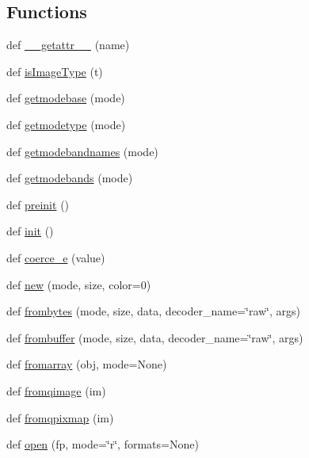 \subsection*{Functions}
\begin{DoxyCompactItemize}
\item 
def \hyperlink{namespacePIL_1_1Image_af8d4e74b562bf94355af0c4fa545c562}{\+\_\+\+\_\+getattr\+\_\+\+\_\+} (name)
\item 
def \hyperlink{namespacePIL_1_1Image_a98e2f107c84c08a9a518f23e8dbab804}{is\+Image\+Type} (t)
\item 
def \hyperlink{namespacePIL_1_1Image_a7d4b86f15fb169471254d5239a94bf64}{getmodebase} (mode)
\item 
def \hyperlink{namespacePIL_1_1Image_ae7953cd6e6a3ad042c5187330c0314fc}{getmodetype} (mode)
\item 
def \hyperlink{namespacePIL_1_1Image_aaed91fedabe8cc0158bb5959a96dc350}{getmodebandnames} (mode)
\item 
def \hyperlink{namespacePIL_1_1Image_a49d529acf29fb98d6677bbe21c7b664f}{getmodebands} (mode)
\item 
def \hyperlink{namespacePIL_1_1Image_a87bc1e46f66de1ee18167ab66d1871c1}{preinit} ()
\item 
def \hyperlink{namespacePIL_1_1Image_a2eb65f2bf7b1f1e412bdb4abb97dda13}{init} ()
\item 
def \hyperlink{namespacePIL_1_1Image_a07a4e23826643b255b2ba585e84c04ec}{coerce\+\_\+e} (value)
\item 
def \hyperlink{namespacePIL_1_1Image_a678b32ccbe852b5442261810ec9064e9}{new} (mode, size, color=0)
\item 
def \hyperlink{namespacePIL_1_1Image_a32a745719bae0c9b016e2959c851cc22}{frombytes} (mode, size, data, decoder\+\_\+name=\char`\"{}raw\char`\"{}, args)
\item 
def \hyperlink{namespacePIL_1_1Image_addf457b4a5c943977ab666c2356ff755}{frombuffer} (mode, size, data, decoder\+\_\+name=\char`\"{}raw\char`\"{}, args)
\item 
def \hyperlink{namespacePIL_1_1Image_aeea8260fec1727a6571f301837ee59f7}{fromarray} (obj, mode=None)
\item 
def \hyperlink{namespacePIL_1_1Image_acc7617ffb052e0a5821b7768048621e5}{fromqimage} (im)
\item 
def \hyperlink{namespacePIL_1_1Image_aec27bb6d5f0631be635a7adb5e69543f}{fromqpixmap} (im)
\item 
def \hyperlink{namespacePIL_1_1Image_ab9bdc9a51ac412455e608c8fec4242b9}{open} (fp, mode=\char`\"{}r\char`\"{}, formats=None)

\end{DoxyCompactItemize}
